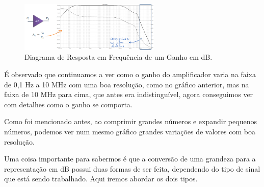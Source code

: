 \begin{figure}[hh]
    \centering
    \includegraphics[width=0.6\textwidth]{imgs/diagrama2.png}
    \caption{Diagrama de Resposta em Frequência de um Ganho em dB.}
    \label{fig:ccco}
\end{figure}

É observado que continuamos a ver como o ganho do amplificador varia na faixa de 0,1 Hz a 10 MHz com uma boa resolução, como no gráfico anterior, mas na faixa de 10 MHz para cima, que antes era indistinguível, agora conseguimos ver com detalhes como o ganho se comporta. 

 Como foi mencionado antes, ao comprimir grandes números e expandir pequenos números, podemos ver num mesmo gráfico grandes variações de valores com boa resolução.
 
 Uma coisa importante para sabermos é que a conversão de uma grandeza para a representação em dB possui duas formas de ser feita, dependendo do tipo de sinal que está sendo trabalhado. Aqui iremos abordar os dois tipos.
 

